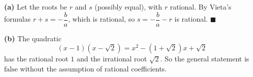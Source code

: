 \textbf{(a)} Let the roots be $r$ and $s$ (possibly equal), with $r$ rational. By Vieta's formulas $r+s=-\dfrac ba$, which is rational, so $s=-\dfrac ba-r$ is rational. $\blacksquare$

\textbf{(b)} The quadratic
\[(x-1)\left(x-\sqrt2\right)=x^2-\left(1+\sqrt2\right)x+\sqrt2\]
has the rational root $1$ and the irrational root $\sqrt2$. So the general statement is $\boxed{\text{false}}$ without the assumption of rational coefficients.

